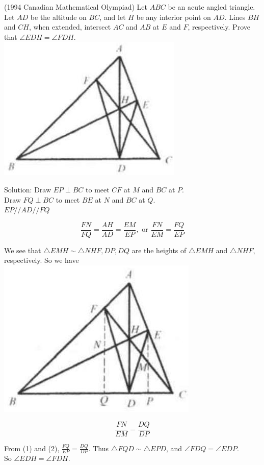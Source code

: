 \documentclass{article}
\begin{document}
(1994 Canadian Mathematical Olympiad) Let \(A B C\) be an acute angled triangle. Let \(A D\) be the altitude on \(B C\), and let \(H\) be any interior point on \(A D\). Lines \(B H\) and \(C H\), when extended, intersect \(A C\) and \(A B\) at \(E\) and \(F\), respectively. Prove that \(\angle E D H=\angle F D H\).\\
\centering
\includegraphics[width=\textwidth]{images/087.jpg}

Solution:
Draw \(E P \perp B C\) to meet \(C F\) at \(M\) and \(B C\) at \(P\).\\
Draw \(F Q \perp B C\) to meet \(B E\) at \(N\) and \(B C\) at \(Q\).\\
\(E P / / A D / / F Q\)

\[
\frac{F N}{F Q}=\frac{A H}{A D}=\frac{E M}{E P}, \text { or } \frac{F N}{E M}=\frac{F Q}{E P}
\]

We see that \(\triangle E M H \sim \triangle N H F, D P, D Q\) are the heights of \(\triangle E M H\) and \(\triangle N H F\), respectively. So we have\\
\centering
\includegraphics[width=\textwidth]{images/087(1).jpg}

\[
\frac{F N}{E M}=\frac{D Q}{D P}
\]

From (1) and (2), \(\frac{F Q}{E P}=\frac{D Q}{D P}\). Thus \(\triangle F Q D \sim \triangle E P D\), and \(\angle F D Q=\angle E D P\).\\
So \(\angle E D H=\angle F D H\).
\end{document}
